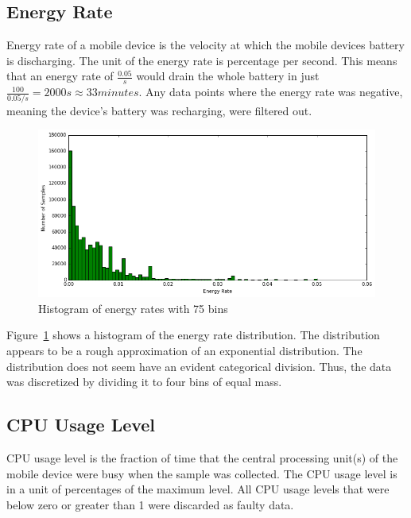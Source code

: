 \subsection{Energy Rate}

Energy rate of a mobile device is the velocity at which the mobile devices battery is discharging. The unit of the energy rate is percentage per second. This means that an energy rate of $\frac{0.05}{s}$ would drain the whole battery in just $\frac{100}{0.05 / s} = 2000 s \approx 33 minutes$. Any data points where the energy rate was negative, meaning the device's battery was recharging, were filtered out.

\begin{figure} %
	\centering
	\includegraphics[width=\textwidth]{images/carat-data/energy_rate.png}
	\caption{Histogram of energy rates with 75 bins}
	\label{figure:carat-data-energy-rate}
\end{figure}  

Figure~\ref{figure:carat-data-energy-rate} shows a histogram of the energy rate distribution. The distribution appears to be a rough approximation of an exponential distribution. The distribution does not seem have an evident categorical division. Thus, the data was discretized by dividing it to four bins of equal mass. 

\subsection{CPU Usage Level} \label{carat data cpu} 

CPU usage level is the fraction of time that the central processing unit(s) of the mobile device were busy when the sample was collected. The CPU usage level is in a unit of percentages of the maximum level. All CPU usage levels that were below zero or greater than 1 were discarded as faulty data.

